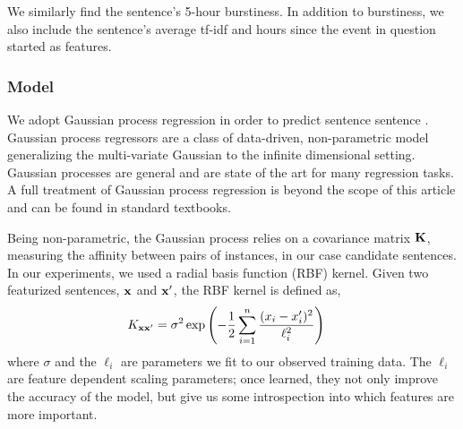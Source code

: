 We similarly find the sentence's 5-hour burstiness.  In addition to burstiness, we also include the sentence's average tf-idf and hours since the event in question started as features.

\subsubsection{Model}
We adopt Gaussian process regression in order to predict sentence sentence \cite{rasmussen:gaussian-process-book}.  Gaussian process regressors are a class of data-driven, non-parametric model generalizing the multi-variate Gaussian to the infinite dimensional setting.  Gaussian processes are  general and are state of the art for many regression tasks.  A full treatment of Gaussian process regression is beyond the scope of this article and can be found in standard textbooks.  


Being non-parametric, the Gaussian process relies on a  covariance matrix $\mathbf{K}$, measuring the affinity between pairs of instances, in our case candidate sentences.  In our experiments, we used a radial basis function (RBF) kernel.  Given two featurized sentences, $\mathbf{x}$ and $\mathbf{x}^\prime$, the RBF kernel is defined as,
\begin{align*}
	K_{\mathbf{x}\mathbf{x}^\prime}&= \sigma^2 \exp\left(- \frac{1}{2} 
\sum_{i=1}^{n} \frac{ (x_{i}-x_{i}^\prime)^2}{\ell_i^2} \right)
\end{align*}
where $\sigma$ and the $\ell_i$ are parameters we fit to our observed training data. The $\ell_i$ are feature dependent scaling parameters; once learned, they not only improve the accuracy of the model, but give us some introspection  into which features are more important.


